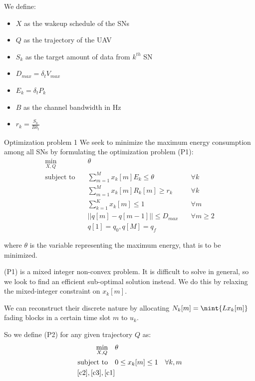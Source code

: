 \documentclass{beamer}
\DeclarePairedDelimiter{\nint}\lfloor\rceil
\begin{document}
\begin{frame}{}

\begin{block}{}
We define:
\begin{itemize}
    \item $X$ as the wakeup schedule of the SNs
    \item $Q$ as the trajectory of the UAV
    \item $S_k$ as the target amount of data from $k^{th}$ SN
    \item $D_{max}=\delta_t V_{max}$
    \item $E_k=\delta_t P_k$
    \item $B$ as the channel bandwidth in Hz
    \item $r_k=\frac{S_k}{B\delta_t}$
\end{itemize}
\end{block}
\end{frame}
\begin{frame}{Optimization problem 1}
    We seek to minimize the maximum energy consumption among all SNs by formulating the optimization problem (P1):
    \begin{align}
    \min_{X, Q}\quad &\theta \\ 
    \text{subject to}\quad &\sum_{m=1}^{M}x_k[m] E_k \leq \theta  \quad &\forall k \label{c2}\\ 
    &\sum_{m=1}^{M}x_k[m] R_k[m] \geq r_k \quad &\forall k \label{c3}\\ 
     &\sum_{k=1}^K x_k[m]\leq 1 \quad &\forall m\label{c1}\\
    &||q[m]-q[m-1]||\leq D_{max} \quad &\forall m \geq 
    2\label{dc1}\\
    &q[1]=q_0, q[M]=q_f\label{dc2}
    \end{align}
    
    where $\theta$ is the variable representing the maximum energy, that is to be minimized.
\end{frame}
\begin{frame}{}
    (P1) is a mixed integer non-convex problem. It is difficult to solve in general, so we look to find an efficient sub-optimal solution instead. We do this by relaxing the mixed-integer constraint on $x_k[m]$.
    
    
    We can reconstruct their discrete nature by allocating $N_k[m]=\nint{Lx_k[m]}$ fading blocks in a certain time slot $m$ to $u_k$. 
    
    So we define (P2) for any given trajectory $Q$ as:
    \begin{align}
        \min_{X, Q}\quad &\theta\\
        \text{subject to}\quad &0 \leq x_k[m]\leq 1\quad \forall k, m\\
       \eqref{c2}, \eqref{c3},  \eqref{c1}
    \end{align}
\end{frame}
\end{document}
